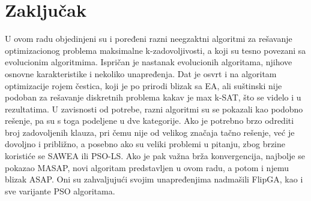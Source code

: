 \documentclass[a4paper]{article}
\begin{document}
\section{Zaključak}
\label{sec:zakljucak}
U ovom radu objedinjeni su i poređeni razni neegzaktni algoritmi za rešavanje 
optimizacionog problema maksimalne k-zadovoljivosti, 
a koji su tesno povezani sa evolucionim algoritmima. Ispričan je nastanak 
evolucionih algoritama, njihove osnovne karakteristike i nekoliko unapređenja. 
Dat je osvrt i na algoritam optimizacije rojem čestica, koji je po prirodi blizak sa EA,
ali suštinski nije podoban za rešavanje diskretnih problema kakav je max k-SAT, 
što se videlo i u rezultatima. U zavisnosti od potrebe, razni algoritmi su se pokazali
kao podobno rešenje, pa su s toga podeljene u dve kategorije.
Ako je potrebno brzo odrediti broj zadovoljenih klauza,
pri čemu nije od velikog značaja tačno rešenje, već je dovoljno i približno,
a posebno ako su veliki problemi u pitanju, zbog brzine koristiće se SAWEA ili PSO-LS.
Ako je pak važna brža konvergencija, najbolje se pokazao MASAP, novi algoritam 
predstavljen u ovom radu, a potom i njemu blizak ASAP. 
Oni su zahvaljujući svojim unapređenjima nadmašili FlipGA, 
kao i sve varijante PSO algoritama.



\appendix
\newpage
 

\end{document}
